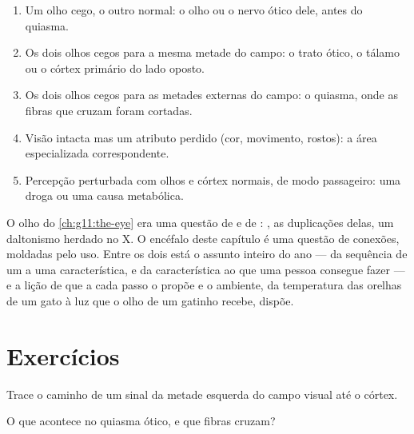 \begin{method}\label{met:g11:vision-and-brain:locate}
\begin{enumerate}
  \item Um olho cego, o outro normal: o olho ou o nervo ótico dele,
        antes do quiasma.
  \item Os dois olhos cegos para a mesma metade do campo: o trato
        ótico, o tálamo ou o córtex primário do lado oposto.
  \item Os dois olhos cegos para as metades externas do campo: o
        quiasma, onde as fibras que cruzam foram cortadas.
  \item Visão intacta mas um atributo perdido (cor, movimento,
        rostos): a área especializada correspondente.
  \item Percepção perturbada com olhos e córtex normais, de modo
        passageiro: uma droga ou uma causa metabólica.
\end{enumerate}
\end{method}

\begin{remark}\label{rem:g11:vision-and-brain:year}
O olho do \cref{ch:g11:the-eye} era uma questão de  e de
: , as duplicações delas, um daltonismo herdado no X. O
encéfalo deste capítulo é uma questão de conexões, moldadas pelo uso.
Entre os dois está o assunto inteiro do ano --- da sequência de um 
a uma característica, e da característica ao que uma pessoa consegue
fazer --- e a lição de que a cada passo o  propõe e o ambiente,
da temperatura das orelhas de um gato à luz que o olho de um gatinho
recebe, dispõe.
\end{remark}

\section{Exercícios}

\begin{exercise}[$\star$]\label{exo:g11:vision-and-brain:1}
Trace o caminho de um sinal da metade esquerda do campo visual até o
córtex.
\end{exercise}

\begin{exercise}[$\star$]\label{exo:g11:vision-and-brain:2}
O que acontece no quiasma ótico, e que fibras cruzam?
\end{exercise}

